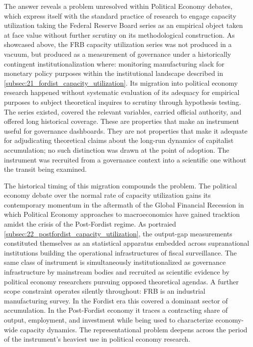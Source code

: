 \documentclass[11pt,a4paper]{article}
\begin{document}
The answer reveals a problem unresolved within Political Economy debates, which express itself with the standard practice of research to engage capacity utilization taking the Federal Reserve Board series as an empirical
object taken at face value without further scrutiny on its methodological construction. As showcased above, the FRB capacity utilization series was not produced in a vacuum, but produced as a measurement of governance under a historically contingent institutionalization where: monitoring manufacturing slack for monetary policy purposes within the institutional landscape described in \ref{subsec:21_fordist_capacity_utilization}. Its migration into political economy research happened without systematic evaluation of its adequacy for empirical purposes to subject theoretical inquires to scrutiny through hypothesis testing. The series existed, covered the relevant variables, carried official
authority, and offered long historical coverage. These are properties that make an instrument useful for governance dashboards. They are not properties that make it adequate for adjudicating theoretical claims about the long-run dynamics of capitalist accumulation; no such distinction was drawn at the point of adoption. The instrument was
recruited from a governance context into a scientific one without the transit being examined.

The historical timing of this migration compounds the problem. The political economy debate over the normal rate of capacity utilization gains its contemporary momentum in the aftermath of the Global Financial Recession in which Political Economy approaches to macroeconomics have gained tracktion amidst the crisis of the Post-Fordist regime. As portraied \ref{subsec:22_postfordist_capacity_utilization}, the output-gap measurements constituted themselves as an statistical apparatus embedded across supranational institutions building the operational infrastructures of fiscal surveillance.  The same class of instrument is simultaneously institutionalized as governance infrastructure by mainstream bodies and recruited as scientific evidence by political economy researchers pursuing opposed theoretical agendas. A further scope constraint operates silently throughout: FRB is an industrial manufacturing survey. In the Fordist era this covered a dominant sector of accumulation. In the Post-Fordist economy it traces a contracting share of output, employment, and investment while being used to characterize economy-wide capacity dynamics. The representational problem deepens across the period of the instrument's heaviest use in political economy research.
\end{document}
